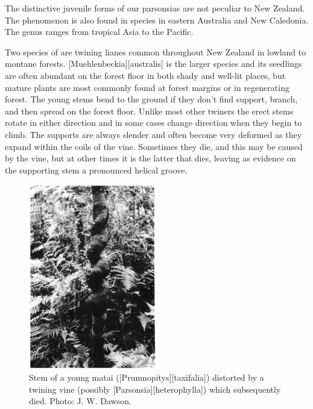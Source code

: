 The distinctive juvenile forms of our parsonsias are not peculiar to New Zealand.
The phenomenon is also found in species in eastern Australia and New Caledonia.
The genus ranges from tropical Asia to the Pacific.

Two species of  are twining lianes common throughout New Zealand in lowland to montane forests. [Muehlenbeckia][australis] is the larger species and its seedlings are often abundant on the forest floor in both shady and well-lit places, but mature plants are most commonly found at forest margins or in regenerating forest.
The young stems bend to the ground if they don't find support, branch, and then spread on the forest floor.
Unlike most other twiners the erect stems rotate in either direction and in some cases change direction when they begin to climb.
The supports are always slender and often become very deformed as they expand within the coils of the vine.
Sometimes they die, and this may be caused by the vine, but at other times it is the latter that dies, leaving as evidence on the supporting stem a pronounced helical groove.

\begin{figure}
	\includegraphics[width=0.5\textwidth]{graphics/figure35matai.jpg}
	\centering
	\caption[Stem of a young matai]{Stem of a young matai ([Prumnopitys][taxifalia]) distorted by a twining vine (possibly [Parsonsia][heterophylla]) which subsequently died.
	Photo: J. W. Dawson.}%
	\label{fig:35matai}
\end{figure}

